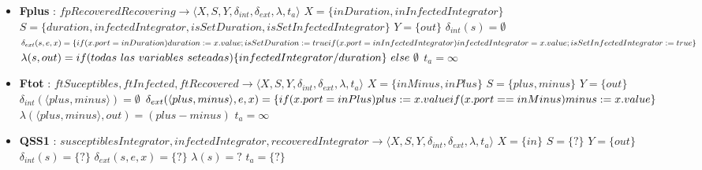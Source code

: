 \begin{itemize}
\item \textbf{Fplus} : $ fpRecoveredRecovering \rightarrow \langle X, S, Y, \delta_{int}, \delta_{ext}, \lambda, t_{a} \rangle$ \newline
$ X = \{ inDuration, inInfectedIntegrator \} $ \newline
$ S = \{ duration, infectedIntegrator, isSetDuration, isSetInfectedIntegrator \} $ \newline
$ Y = \{ out \} $ \newline
$ \delta_{int}(s) = \emptyset $ \newline
$ \delta_{ext}(s, e, x) = \{
\\if (x.port = inDuration) duration := x.value; isSetDuration := true
\\if (x.port = inInfectedIntegrator) infectedIntegrator = x.value; \\isSetInfectedIntegrator := true 
\} $ \newline
$ \lambda(s, out) = if(todas \ las \ variables \ seteadas) \{ 
\\infectedIntegrator/duration\} \ else \ \emptyset$ \newline
$ t_{a} = \infty $

\item \textbf{Ftot} : $ ftSuceptibles, ftInfected, ftRecovered \rightarrow \langle X, S, Y, \delta_{int}, \delta_{ext}, \lambda, t_{a} \rangle$ \newline
$ X = \{ inMinus, inPlus \} $ \newline
$ S = \{ plus, minus \} $ \newline
$ Y = \{ out \} $ \newline
$ \delta_{int}(\langle plus, minus \rangle) = \emptyset $ \newline
$ \delta_{ext}(\langle plus, minus \rangle, e, x) = \{ 
\\if (x.port = inPlus) plus := x.value
\\if (x.port == inMinus) minus := x.value
\} $ \newline
$ \lambda(\langle plus, minus \rangle, out) = (plus - minus) $ \newline
$ t_{a} = \infty $ 


\item \textbf{QSS1} : $ susceptiblesIntegrator, infectedIntegrator, recoveredIntegrator  \rightarrow \langle X, S, Y, \delta_{int}, \delta_{ext}, \lambda, t_{a} \rangle$ \newline
$ X = \{ in \} $ \newline
$ S = \{ ? \} $ \newline
$ Y = \{ out \} $ \newline
$ \delta_{int}(s) = \{ ? \} $ \newline
$ \delta_{ext}(s, e, x) = \{ ? \} $ \newline
$ \lambda(s) = ? $ \newline
$ t_{a} = \{ ? \} $ 
\end{itemize}

